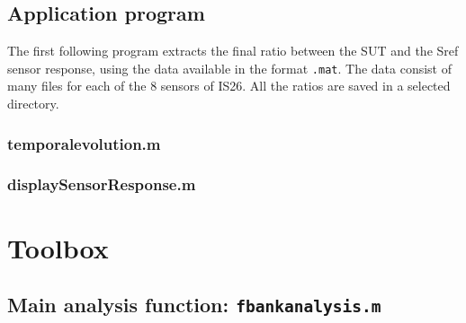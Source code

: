 \documentclass[a4paper, 12pt]{report}
\begin{document}
\section{Application program}
The first following program extracts the final ratio between the SUT and the Sref sensor response, using the data available in the format {\tt .mat}. The data consist of many files for each of the 8 sensors of IS26. All the ratios are saved in a selected directory.


\subsection{temporalevolution.m}
{\tiny }


\subsection{displaySensorResponse.m}
{\tiny }

\chapter{Toolbox}
\label{chap:toolbox}
\section{Main analysis function: {\tt fbankanalysis.m}}
{\tiny }
\end{document}
